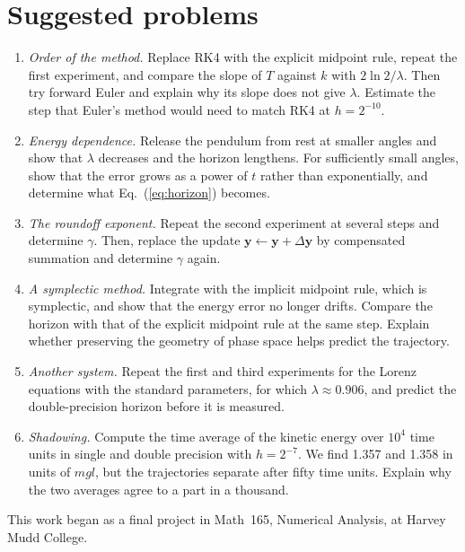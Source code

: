 \documentclass[prb,reprint,amsmath,amssymb,longbibliography]{revtex4-1}
\begin{document}
\section{Suggested problems}

\begin{enumerate}
\item \emph{Order of the method.} Replace RK4 with the explicit midpoint rule,
repeat the first experiment, and compare the slope of $T$ against $k$ with
$2\ln2/\lambda$. Then try forward Euler and explain why its slope does not give
$\lambda$. Estimate the step that Euler's method would need to match RK4 at
$h=2^{-10}$.
\item \emph{Energy dependence.} Release the pendulum from rest at smaller angles
and show that $\lambda$ decreases and the horizon lengthens. For sufficiently
small angles, show that the error grows as a power of $t$ rather than
exponentially, and determine what Eq.~(\ref{eq:horizon}) becomes.
\item \emph{The roundoff exponent.} Repeat the second experiment at several
steps and determine $\gamma$. Then, replace the update
$\bm y\leftarrow\bm y+\Delta\bm y$ by compensated summation\cite{higham2002} and
determine $\gamma$ again.
\ifdefined\longversion
\item \emph{A symplectic method.} Integrate with the implicit midpoint rule,
which is symplectic, and show that the energy error no longer drifts. Compare
the horizon with that of the explicit midpoint rule at the same step. Explain
whether preserving the geometry of phase space helps predict the trajectory.
\item \emph{Another system.} Repeat the first and third experiments for the
Lorenz equations with the standard parameters, for which
$\lambda\approx0.906$, and predict the double-precision horizon before it is
measured.
\fi
\item \emph{Shadowing.} Compute the time average of the kinetic energy over
$10^4$ time units in single and double precision with $h=2^{-7}$. We find
1.357 and 1.358 in units of $mgl$, but the trajectories separate after fifty
time units. Explain why the two averages agree to a part in a thousand.
\end{enumerate}

\ifanon
\else
\begin{acknowledgments}
This work began as a final project in Math~165, Numerical Analysis, at Harvey
Mudd College.
\end{acknowledgments}
\fi
\end{document}
